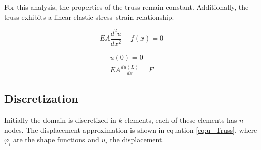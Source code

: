 \documentclass{article}
\begin{document}
\vspace{2ex}

For this analysis, the properties of the truss remain constant. Additionally, the truss exhibits
a linear elastic stress–strain relationship.

\vspace{2ex}

\begin{equation}\label{eq:1D_Truss}
    EA\frac{d^2u}{dx^2} + f(x)=0
\end{equation}

\vspace{2ex}

\begin{equation}\label{eq:BC_Truss}
    \begin{gathered}
        u(0)=0\\
        EA\frac{du(L)}{dx}=F
    \end{gathered}
\end{equation}

\vspace{2ex}


\subsection{Discretization}

Initially the domain is discretized in $k$ elements, each of these elements has $n$ nodes. The displacement approximation is shown in equation \ref{eq:u_Truss}, where $\varphi_i$ are the shape functions and $u_i$ the displacement. 

\vspace{2ex}

\end{document}

